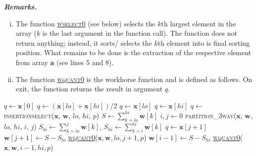 \documentclass[a4paper,oneside,11pt,DIV=12]{scrartcl}
\begin{document}
\vspace{1em}
\noindent\textbf{\sffamily \small \itshape Remarks.}
\vspace{-0.5em}
\begin{enumerate}[i)]
	\item The function \hyperlink{alg:wselect0}{\textsc{wselect0}} (see below) selects the $k$th largest element in the array ($k$ is the last argument in the function call). The function does not return anything; instead, it sorts/ selects the $k$th element into is final sorting position. What remains to be done is the extraction of the respective element from array $\bm a$ (see lines 5 and 8).  
	\item The function \hyperlink{alg:wquant0}{\textsc{wquant0}} is the workhorse function and is defined as follows. On exit, the function returns the result in argument $q$. 
\end{enumerate}

\vspace{1em}

\begin{algorithmic}[1]
	\hypertarget{alg:wquant0}{}
			\State $q \gets \bm x[0]$
			\State \Return
		\EndIf
				\State $q \gets (\bm x[lo] + \bm x[hi]) / 2$
				\State \Return
				\State $q \gets \bm x[lo]$
				\State \Return
			\Else
				\State $q \gets \bm x[hi]$
				\State \Return
			\EndIf
		\EndIf
 			\State $q \gets$ \textsc{insertionselect}($\bm x$, $\bm w$, $lo$, $hi$, $p$)
		\EndIf
		\State $S \gets \sum_{k=lo}^{hi} \bm w[k]$
		\State $i,j \gets 0$
		\State \textsc{partition\_3way($\bm x$, $\bm w$, $lo$, $hi$, $i$, $j$)}
		\State $S_{lo} \gets \sum_{k=lo}^j \bm w[k]$, \quad $S_{hi} \gets \sum_{k=i}^{hi} \bm w[k]$
			\State $q \gets \bm x[j + 1]$
			\State \Return
		\Else
				\State $\bm w[j+1] \gets S - S_{lo}$
				\State \hyperlink{alg:wquant0}{\textsc{wquant0}}($\bm x, \bm w, lo, j + 1, p$) 
			\Else
				\State $\bm w[i-1] \gets S - S_{hi}$
				\State \hyperlink{alg:wquant0}{\textsc{wquant0}}($\bm x, \bm w, i-1, hi, p$) 
			\EndIf
		\EndIf
	\EndFunction
\end{algorithmic}
\end{document}
